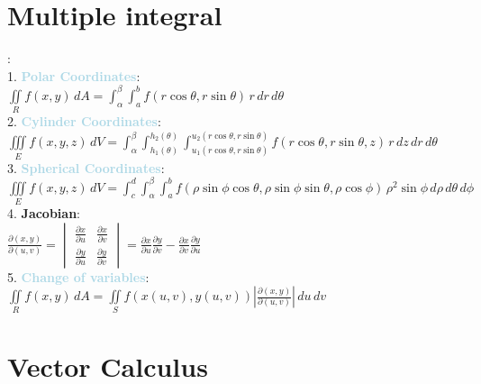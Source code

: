 \documentclass[twocolumn]{article}
\newcommand{\method}[1]{\textbf{\textcolor{lightblue}{#1}}}
\begin{document}
\section{Multiple integral}
:\\
1. \method{\textbf{Polar Coordinates}}:\\ $\iint\limits_R f(x, y) \, dA = \int_\alpha^\beta \int_a^b f(r \cos \theta, r \sin \theta) \, r \, dr \, d\theta$\\
2. \method{\textbf{Cylinder Coordinates}}:\\ $\iiint\limits_E f(x, y, z) \, dV = \int_\alpha^\beta \int_{h_1(\theta)}^{h_2(\theta)} \int_{u_1(r \cos \theta, r \sin \theta)}^{u_2(r \cos \theta, r \sin \theta)} f(r \cos \theta, r \sin \theta, z) \, r \, dz \, dr \, d\theta$\\
3. \method{\textbf{Spherical Coordinates}}:\\ $\iiint\limits_E f(x, y, z) \, dV = \int_c^d \int_\alpha^\beta \int_a^b f(\rho \sin \phi \cos \theta, \rho \sin \phi \sin \theta, \rho \cos \phi) 
\, \rho^2 \sin \phi \, d\rho \, d\theta \, d\phi$
4. \textbf{Jacobian}:\\
$
\frac{\partial(x, y)}{\partial(u, v)} = 
\begin{vmatrix}
	\frac{\partial x}{\partial u} & \frac{\partial x}{\partial v} \\[8pt]
	\frac{\partial y}{\partial u} & \frac{\partial y}{\partial v}
\end{vmatrix}
= \frac{\partial x}{\partial u} \frac{\partial y}{\partial v} - \frac{\partial x}{\partial v} \frac{\partial y}{\partial u}
$\\
5. \method{\textbf{Change of variables}}:\\
$\iint\limits_R f(x, y) \, dA = \iint\limits_S f(x(u, v), y(u, v)) 
\left| \frac{\partial(x, y)}{\partial(u, v)} \right| \, du \, dv$

\section{Vector Calculus}
\end{document}
